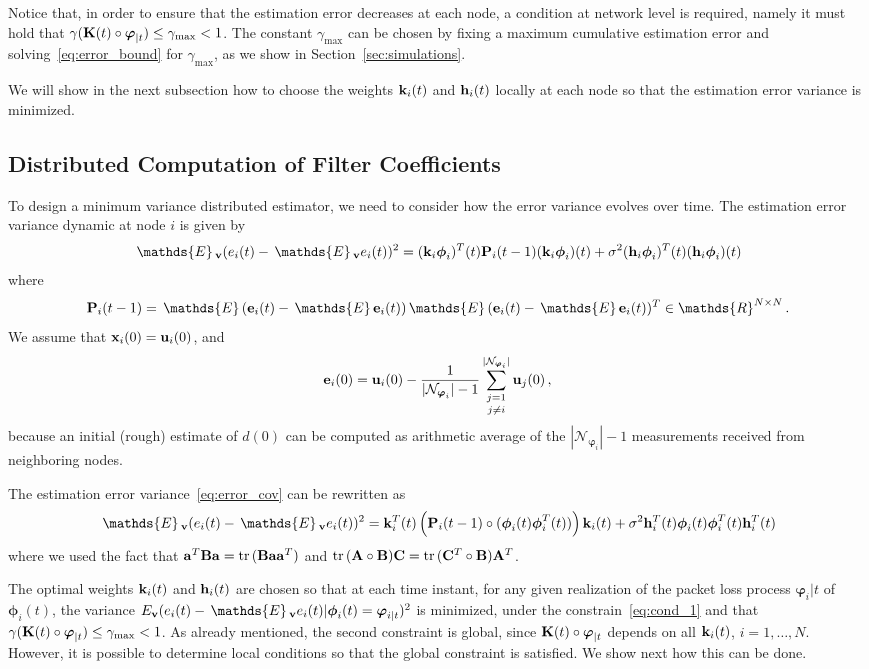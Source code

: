 \documentclass[a4paper,notitlepage,onecolumn]{article}
\def\R{\mathds{R}}
\def\P{\mathds{P}}
\def\K{{\cal K}}
\def\x{{\bf x}}
\def\u{{\bf u}}
\def\k{{\bf k}}
\def\h{{\bf h}}
\def\e{{\bf e}}
\def\v{{\bf v}}
\def\K{{\bf K}}
\def\P{{\bf P}}
\def\phib{\boldsymbol{\phi}}
\def\varphib{\boldsymbol{\varphi}}
\def\trace{{\rm tr}\,}
\def\E{\,\mathds{E}\,}
\numberwithin{equation}{section}
\begin{document}
Notice that, in order to ensure that the estimation error
decreases at each node, a condition at network level is
required, namely it must hold that
$\gamma(\K(t) \circ \varphib_{|t})\leq\gamma_{\max}<1$. The constant $\gamma_{\max}$
can be chosen by fixing a maximum cumulative estimation
error and solving~\eqref{eq:error_bound} for
$\gamma_{\max}$, as we show in Section~\ref{sec:simulations}.

We will show in the next subsection how to choose the
weights $\k_i(t)$ and $\h_i(t)$ locally at each node so that the estimation
error variance is minimized.

\subsection{Distributed Computation of Filter Coefficients}

To design a minimum variance distributed estimator, we
need to consider how the error variance evolves over time. The
estimation error variance dynamic at node $i$ is given by
\begin{align}
    \E_\v (e_i(t) - \E_\v e_i(t))^2 =
    (\k_i\phib_i)^T(t) \P_i(t-1) (\k_i\phib_i)(t)+
    \sigma^2 (\h_i\phib_i)^T(t) (\h_i\phib_i)(t)
    \label{eq:error_cov}
\end{align}
where
$$
    \P_i(t-1) = \E (\mathbf{e}_i(t) - \E \mathbf{e}_i(t))\E (\mathbf{e}_i(t) - \E
    \mathbf{e}_i(t))^T \in \R^{N \times N}\,.
$$
We assume that $\x_i(0) = \u_i(0)$, and
$$
    \e_i(0) = \u_i(0) - \frac{1}{|\mathcal{N}_{\varphib_i}| -1 } \mathop{\sum_{j=1}^{|\mathcal{N}_{\varphib_i}|}}_{j\neq i} \u_j(0) \,,
$$
because an initial (rough) estimate of $d(0)$ can be computed as
arithmetic average of the $|\mathcal{N}_{\varphib_i}| -1$
measurements received from neighboring nodes.

The estimation error variance~\eqref{eq:error_cov} can be
rewritten as
$$
    \E_\v (e_i(t) - \E_\v e_i(t))^2 = \k_i^T(t) \left(\P_i(t-1) \circ
    (\phib_i(t) \phib_i^T(t))\right) \k_i(t) + \sigma^2 \h_i^T(t)
     \phib_i(t) \phib_i^T(t)  \h_i^T(t)
$$
where we used the fact that $\mathbf{a}^T \mathbf{B}
\mathbf{a} = \trace (\mathbf{B} \mathbf{aa}^T)$ and $\trace
(\mathbf{A} \circ \mathbf{B}) \mathbf{C} = \trace
(\mathbf{C}^T \circ \mathbf{B}) \mathbf{A}^T$.

The optimal weights $\k_i(t)$ and $\h_i(t)$ are chosen so that at
each time instant, for any given realization of the packet loss
process $\varphib_i{|t}$ of $\phib_i(t)$, the variance $E_\v
(e_i(t) - \E_\v e_i(t)|\phib_i(t)=\varphib_{i|t})^2$ is minimized, under the constrain~\eqref{eq:cond_1} and that $\gamma(\K(t) \circ \varphib_{|t})\leq \gamma_{\max} <1$.
As already mentioned, the second constraint is global, since $\K(t) \circ \varphib_{|t}$
depends on all $\k_i(t)$, $i=1,\ldots,N$. However, it is possible to determine local conditions so that the global constraint is satisfied. We show next how this can be done.
\end{document}

